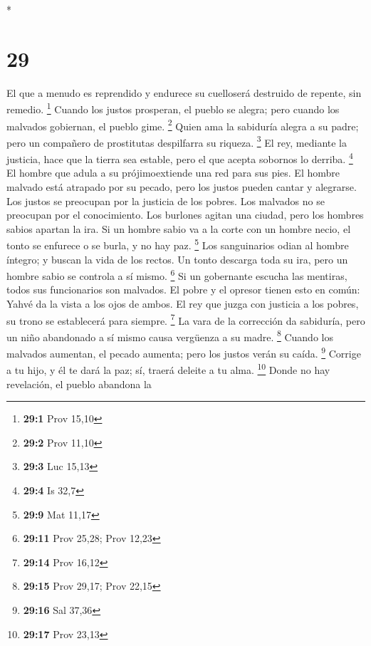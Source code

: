 \begin{paracol}{2}
\begin{otherlanguage}{english}
\end{otherlanguage}

\switchcolumn[0]*

\hypertarget{section-56}{%
\section{29}\label{section-56}}

 El que a menudo es reprendido y endurece su cuelloserá
destruido de repente, sin remedio. \footnote{\textbf{29:1} Prov 15,10}
 Cuando los justos prosperan, el pueblo se alegra; pero
cuando los malvados gobiernan, el pueblo gime. \footnote{\textbf{29:2}
  Prov 11,10}  Quien ama la sabiduría alegra a su padre;
pero un compañero de prostitutas despilfarra su riqueza. \footnote{\textbf{29:3}
  Luc 15,13}  El rey, mediante la justicia, hace que la
tierra sea estable, pero el que acepta sobornos lo derriba. \footnote{\textbf{29:4}
  Is 32,7}  El hombre que adula a su prójimoextiende una
red para sus pies.  El hombre malvado está atrapado por su
pecado, pero los justos pueden cantar y alegrarse.  Los
justos se preocupan por la justicia de los pobres. Los malvados no se
preocupan por el conocimiento.  Los burlones agitan una
ciudad, pero los hombres sabios apartan la ira.  Si un
hombre sabio va a la corte con un hombre necio, el tonto se enfurece o
se burla, y no hay paz. \footnote{\textbf{29:9} Mat 11,17}
 Los sanguinarios odian al hombre íntegro; y buscan la
vida de los rectos.  Un tonto descarga toda su ira, pero
un hombre sabio se controla a sí mismo. \footnote{\textbf{29:11} Prov
  25,28; Prov 12,23}  Si un gobernante escucha las
mentiras, todos sus funcionarios son malvados.  El pobre
y el opresor tienen esto en común: Yahvé da la vista a los ojos de
ambos.  El rey que juzga con justicia a los pobres, su
trono se establecerá para siempre. \footnote{\textbf{29:14} Prov 16,12}
 La vara de la corrección da sabiduría, pero un niño
abandonado a sí mismo causa vergüenza a su madre. \footnote{\textbf{29:15}
  Prov 29,17; Prov 22,15}  Cuando los malvados aumentan,
el pecado aumenta; pero los justos verán su caída. \footnote{\textbf{29:16}
  Sal 37,36}  Corrige a tu hijo, y él te dará la paz; sí,
traerá deleite a tu alma. \footnote{\textbf{29:17} Prov 23,13}
 Donde no hay revelación, el pueblo abandona la

\end{paracol}
